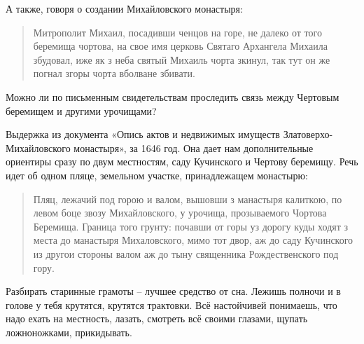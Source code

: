 А также, говоря о создании Михайловского монастыря:

\begin{quotation}
Митрополит Михаил, посадивши ченцов на горе, не далеко от того беремища чортова, на свое имя церковь Святаго Архангела Михаила збудовал, иже як з неба святый Михаиль чорта зкинул, так тут он же погнал згоры чорта вболване збивати.
\end{quotation}





Можно ли по письменным свидетельствам проследить связь между Чертовым беремищем и другими урочищами? 

Выдержка из документа «Опись актов и недвижимых имуществ Златоверхо-Михайловского монастыря», за 1646 год. Она дает нам дополнительные ориентиры сразу по двум местностям, саду Кучинского и Чертову беремищу. Речь идет об одном пляце, земельном участке, принадлежащем монастырю:

\begin{quotation}
Пляц, лежачий под горою и валом, вышовши з манастыря калиткою, по левом боце звозу Михайловского, у урочища, прозываемого Чортова Беремища. Граница того грунту: почавши от горы уз дорогу куды ходят з места до манастыря Михаловского, мимо тот двор, аж до саду Кучинского из другои стороны валом аж до тыну священника Рождественского под гору.
\end{quotation}

Разбирать старинные грамоты – лучшее средство от сна. Лежишь полночи и в голове у тебя крутятся, крутятся трактовки. Всё настойчивей понимаешь, что надо ехать на местность, лазать, смотреть всё своими глазами, щупать ложноножками, прикидывать.


